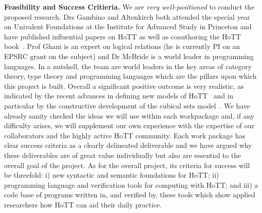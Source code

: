\documentclass[a4paper,11pt]{article}
\begin{document}

{\bf Feasibility and Success Critieria.} We are {\em very well-positioned} to conduct the
proposed research. Drs Gambino and Altenkirch both attended the 
special year on Univalent Foundations at the Institute for Advanced Study in Princeton and have published
influential papers on HoTT as well as coauthoring the HoTT book~\cite{hott-book}. Prof
Ghani is an expert on logical relations (he is currently PI on an
EPSRC grant on the subject) and Dr McBride is a world leader in
programming languages. In a nutshell, the team are world leaders 
in the key areas of category theory, type theory and
programming languages which are the pillars upon which this project is
built. Overall a significant positive outcome is very realistic, as indicated
by the recent advances in defining new models of
HoTT~\cite{ShulmanM:uniidh} and in particular by the constructive
development of the cubical sets model~\cite{BezemM:cubsmt}.  We have
already sanity checked the ideas we will use within each workpackage
and, if any difficulty arises, we will supplement our own experience
with the expertise of our collaborators and the highly active HoTT
community. Each work package has clear success criteria
as a clearly delineated deliverable
and we have argued why these deliverables are of great value individually
but also are essential to the overall goal of the project. As for the
overall project, its criteria for success will be threefold: i) new
syntactic and semantic foundations for HoTT; ii) programming language
and verification tools for computing with HoTT; and iii) a code base
of programs written in, and verified by, these tools which show 
applied researchers how HoTT can aid their daily practice.

\end{document}
